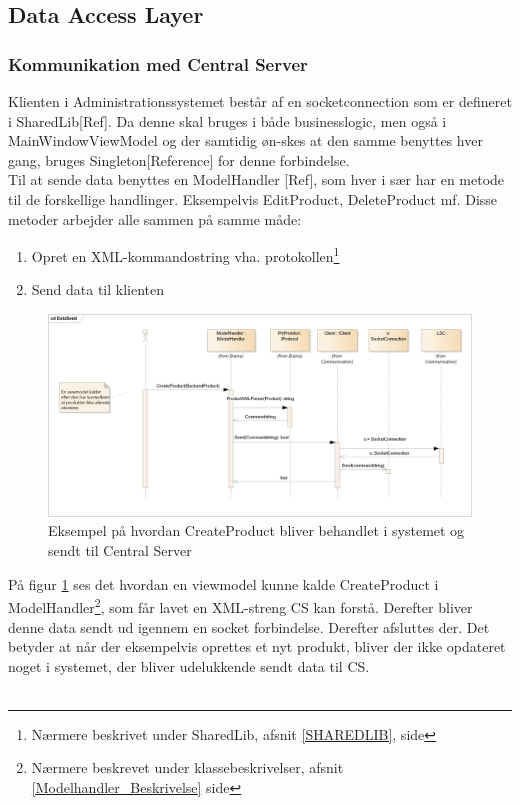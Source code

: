 \subsection{Data Access Layer}




\subsubsection{Kommunikation med Central Server}
Klienten i Administrationssystemet består af en socketconnection som er defineret i SharedLib[Ref]. Da denne skal bruges i både businesslogic, men også i MainWindowViewModel og der samtidig øn-skes at den samme benyttes hver gang, bruges Singleton[Reference] for denne forbindelse. \\
Til at sende data benyttes en ModelHandler [Ref], som hver i sær har en metode til de forskellige handlinger. Eksempelvis EditProduct, DeleteProduct mf. Disse metoder arbejder alle sammen på samme måde:
\begin{enumerate}
\item Opret en XML-kommandostring vha. protokollen\footnote{Nærmere beskrivet under SharedLib, afsnit \ref{SHAREDLIB}, side \pageref{SHAREDLIB}}
\item Send data til klienten
\end{enumerate}


\begin{figure}[!h]
    \centering
    \includegraphics[width=1\textwidth]{Systemdesign/backend/Images/DataSend.png}
    \caption{Eksempel på hvordan CreateProduct bliver behandlet i systemet og sendt til Central Server}
    \label{fig:CreateSend}
\end{figure}

På figur \ref{fig:CreateSend} ses det hvordan en viewmodel kunne kalde CreateProduct i ModelHandler\footnote{Nærmere beskrevet under klassebeskrivelser, afsnit \ref{Modelhandler_Beskrivelse} side \pageref{Modelhandler_Beskrivelse}}, som får lavet en XML-streng \gls{CS} kan forstå. Derefter bliver denne data sendt ud igennem en socket forbindelse.
Derefter afsluttes der. Det betyder at når der eksempelvis oprettes et nyt produkt, bliver der ikke opdateret noget i systemet, der bliver udelukkende sendt data til \gls{CS}.\\\\


